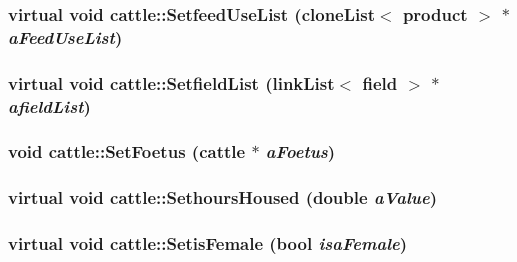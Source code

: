 \label{classcattle_a1a2411237f113c80e1b8aff941aa937c}
\hypertarget{classcattle_a5bb985f9fe851b8850c06a6457e9f8c7}{
\subsubsection[{SetfeedUseList}]{\setlength{\rightskip}{0pt plus 5cm}virtual void cattle::SetfeedUseList ({\bf cloneList}$<$ {\bf product} $>$ $\ast$ {\em aFeedUseList})}}
\label{classcattle_a5bb985f9fe851b8850c06a6457e9f8c7}
\hypertarget{classcattle_a75e4074bb40b9683fcf0b5053247164f}{
\subsubsection[{SetfieldList}]{\setlength{\rightskip}{0pt plus 5cm}virtual void cattle::SetfieldList ({\bf linkList}$<$ {\bf field} $>$ $\ast$ {\em afieldList})}}
\label{classcattle_a75e4074bb40b9683fcf0b5053247164f}
\hypertarget{classcattle_a2656ed54ea449daa5272f721379da95b}{
\subsubsection[{SetFoetus}]{\setlength{\rightskip}{0pt plus 5cm}void cattle::SetFoetus ({\bf cattle} $\ast$ {\em aFoetus})}}
\label{classcattle_a2656ed54ea449daa5272f721379da95b}
\hypertarget{classcattle_abc88c494953dc706add28e0839bdef40}{
\subsubsection[{SethoursHoused}]{\setlength{\rightskip}{0pt plus 5cm}virtual void cattle::SethoursHoused (double {\em aValue})}}
\label{classcattle_abc88c494953dc706add28e0839bdef40}
\hypertarget{classcattle_a3277350bb7f701195d624d9ee10a2f5b}{
\subsubsection[{SetisFemale}]{\setlength{\rightskip}{0pt plus 5cm}virtual void cattle::SetisFemale (bool {\em isaFemale})}}
